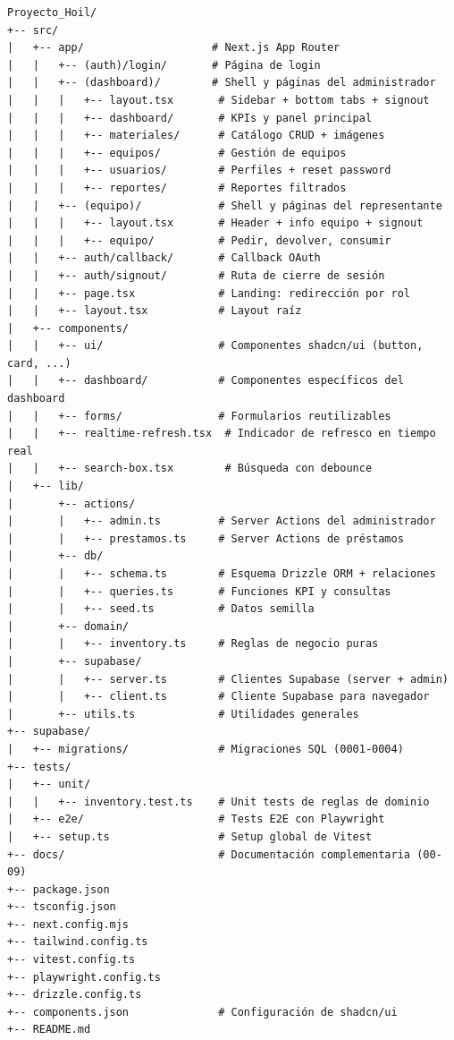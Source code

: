 \documentclass[12pt,a4paper,oneside]{report}
\begin{document}
\begin{verbatim}
Proyecto_Hoil/
+-- src/
|   +-- app/                    # Next.js App Router
|   |   +-- (auth)/login/       # Página de login
|   |   +-- (dashboard)/        # Shell y páginas del administrador
|   |   |   +-- layout.tsx       # Sidebar + bottom tabs + signout
|   |   |   +-- dashboard/       # KPIs y panel principal
|   |   |   +-- materiales/      # Catálogo CRUD + imágenes
|   |   |   +-- equipos/         # Gestión de equipos
|   |   |   +-- usuarios/        # Perfiles + reset password
|   |   |   +-- reportes/        # Reportes filtrados
|   |   +-- (equipo)/            # Shell y páginas del representante
|   |   |   +-- layout.tsx       # Header + info equipo + signout
|   |   |   +-- equipo/          # Pedir, devolver, consumir
|   |   +-- auth/callback/       # Callback OAuth
|   |   +-- auth/signout/        # Ruta de cierre de sesión
|   |   +-- page.tsx             # Landing: redirección por rol
|   |   +-- layout.tsx           # Layout raíz
|   +-- components/
|   |   +-- ui/                  # Componentes shadcn/ui (button, card, ...)
|   |   +-- dashboard/           # Componentes específicos del dashboard
|   |   +-- forms/               # Formularios reutilizables
|   |   +-- realtime-refresh.tsx  # Indicador de refresco en tiempo real
|   |   +-- search-box.tsx        # Búsqueda con debounce
|   +-- lib/
|       +-- actions/
|       |   +-- admin.ts         # Server Actions del administrador
|       |   +-- prestamos.ts     # Server Actions de préstamos
|       +-- db/
|       |   +-- schema.ts        # Esquema Drizzle ORM + relaciones
|       |   +-- queries.ts       # Funciones KPI y consultas
|       |   +-- seed.ts          # Datos semilla
|       +-- domain/
|       |   +-- inventory.ts     # Reglas de negocio puras
|       +-- supabase/
|       |   +-- server.ts        # Clientes Supabase (server + admin)
|       |   +-- client.ts        # Cliente Supabase para navegador
|       +-- utils.ts             # Utilidades generales
+-- supabase/
|   +-- migrations/              # Migraciones SQL (0001-0004)
+-- tests/
|   +-- unit/
|   |   +-- inventory.test.ts    # Unit tests de reglas de dominio
|   +-- e2e/                     # Tests E2E con Playwright
|   +-- setup.ts                 # Setup global de Vitest
+-- docs/                        # Documentación complementaria (00-09)
+-- package.json
+-- tsconfig.json
+-- next.config.mjs
+-- tailwind.config.ts
+-- vitest.config.ts
+-- playwright.config.ts
+-- drizzle.config.ts
+-- components.json              # Configuración de shadcn/ui
+-- README.md
\end{verbatim}
\end{document}
